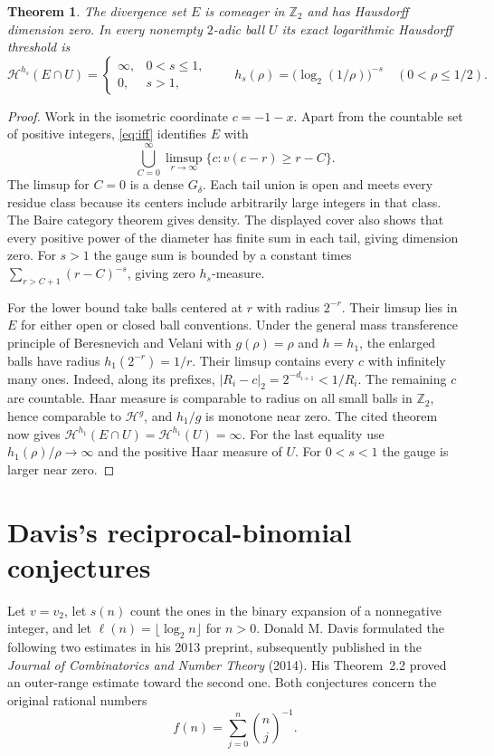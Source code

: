 \documentclass[11pt]{article}
\newtheorem{theorem}{Theorem}[section]
\begin{document}
\begin{theorem}\label{th:metric}
The divergence set $E$ is comeager in $\mathbb Z_2$ and has Hausdorff dimension zero. In every nonempty $2$-adic ball $U$ its exact logarithmic Hausdorff threshold is
\[
  \mathcal H^{h_s}(E\cap U)=
  \begin{cases}
    \infty,&0<s\le1,\\
    0,&s>1,
  \end{cases}
  \qquad h_s(\rho)=\bigl(\log_2(1/\rho)\bigr)^{-s}
       \quad(0<\rho\le1/2).
\]
\end{theorem}
\begin{proof}
Work in the isometric coordinate $c=-1-x$. Apart from the countable set of positive integers, \eqref{eq:iff} identifies $E$ with
\[
 \bigcup_{C=0}^{\infty}\limsup_{r\to\infty}
                  \{c:v(c-r)\ge r-C\}.
\]
The limsup for $C=0$ is a dense $G_\delta$. Each tail union is open and meets every residue class because its centers include arbitrarily large integers in that class. The Baire category theorem gives density. The displayed cover also shows that every positive power of the diameter has finite sum in each tail, giving dimension zero. For $s>1$ the gauge sum is bounded by a constant times $\sum_{r>C+1}(r-C)^{-s}$, giving zero $h_s$-measure.

For the lower bound take balls centered at $r$ with radius $2^{-r}$. Their limsup lies in $E$ for either open or closed ball conventions. Under the general mass transference principle of Beresnevich and Velani \cite[Theorem 3]{BV} with $g(\rho)=\rho$ and $h=h_1$, the enlarged balls have radius $h_1(2^{-r})=1/r$. Their limsup contains every $c$ with infinitely many ones. Indeed, along its prefixes, $|R_i-c|_2=2^{-d_{i+1}}<1/R_i$. The remaining $c$ are countable. Haar measure is comparable to radius on all small balls in $\mathbb Z_2$, hence comparable to $\mathcal H^g$, and $h_1/g$ is monotone near zero. The cited theorem now gives $\mathcal H^{h_1}(E\cap U)=\mathcal H^{h_1}(U)=\infty$. For the last equality use $h_1(\rho)/\rho\to\infty$ and the positive Haar measure of $U$. For $0<s<1$ the gauge is larger near zero.
\end{proof}

\section{Davis's reciprocal-binomial conjectures}\label{dav:section}
Let $v=v_2$, let $s(n)$ count the ones in the binary expansion of a
nonnegative integer, and let $\ell(n)=\lfloor\log_2 n\rfloor$ for
$n>0$. Donald M. Davis formulated the following two estimates in his
2013 preprint, subsequently published in the \emph{Journal of
Combinatorics and Number Theory} (2014). His Theorem~2.2 proved an
outer-range estimate toward the second one. Both conjectures concern
the original rational numbers
\[
                    f(n)=\sum_{j=0}^n\binom nj^{-1}.
\]
\end{document}
